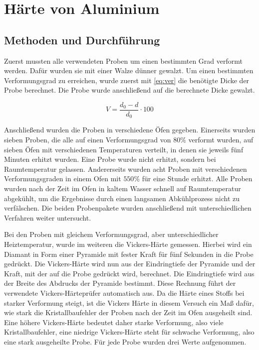 \documentclass[
	a4paper,
	12pt,
	pagesize,
	ngerman
]{scrartcl}
\begin{document}
\section{Härte von Aluminium}
\subsection{Methoden und Durchführung}
Zuerst mussten alle verwendeten Proben um einen bestimmten Grad verformt werden. Dafür wurden sie mit einer Walze dünner gewalzt. Um einen bestimmten Verformungsgrad zu erreichen, wurde zuerst mit \cref{eq:ver} die benötigte Dicke der Probe berechnet. Die Probe wurde anschließend auf die berechnete Dicke gewalzt.

\begin{equation}
V = \frac{d_0-d}{d_0} \cdot 100
\label{eq:ver}
\end{equation}

Anschließend wurden die Proben in verschiedene Öfen gegeben. Einerseits wurden sieben Proben, die alle auf einen Verformungsgrad von $80\%$ verformt wurden, auf sieben Öfen mit verschiedenen Temperaturen verteilt, in denen sie jeweils fünf Minuten erhitzt wurden. Eine Probe wurde nicht erhitzt, sondern bei Raumtemperatur gelassen. Andererseits wurden acht Proben mit verschiedenen Verformungsgraden in einem Ofen mit $550\%$ für eine Stunde erhitzt. Alle Proben wurden nach der Zeit im Ofen in kaltem Wasser schnell auf Raumtemperatur abgekühlt, um die Ergebnisse durch einen langsamen Abkühlprozess nicht zu verfälschen. Die beiden Probenpakete wurden anschließend mit unterschiedlichen Verfahren weiter untersucht.

Bei den Proben mit gleichem Verformungsgrad, aber unterschiedlicher Heiztemperatur, wurde im weiteren die Vickers-Härte gemessen. Hierbei wird ein Diamant in Form einer Pyramide mit fester Kraft für fünf Sekunden in die Probe gedrückt. Die Vickers-Härte wird nun aus der Eindringtiefe der Pyramide und der Kraft, mit der auf die Probe gedrückt wird, berechnet. Die Eindringtiefe wird aus der Breite des Abdrucks der Pyramide bestimmt. Diese Rechnung führt der verwendete Vickers-Härteprüfer automatisch aus. Da die Härte eines Stoffs bei starker Verformung steigt, ist die Vickers Härte in diesem Versuch ein Maß dafür, wie stark die Kristallbaufehler der Proben nach der Zeit im Ofen ausgeheilt sind. Eine höhere Vickers-Härte bedeutet daher starke Verformung, also viele Kristallbaufehler, eine niedrige Vickers-Härte steht für schwache Verformung, also eine stark ausgeheilte Probe. Für jede Probe wurden drei Werte aufgenommen.
\end{document}
